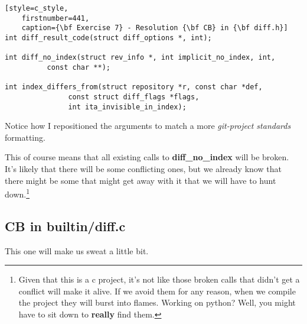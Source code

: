 \begin{lstlisting}[style=c_style,
	firstnumber=441,
	caption={\bf Exercise 7} - Resolution {\bf CB} in {\bf diff.h}]
int diff_result_code(struct diff_options *, int);

int diff_no_index(struct rev_info *, int implicit_no_index, int,
		  const char **);

int index_differs_from(struct repository *r, const char *def,
		       const struct diff_flags *flags,
		       int ita_invisible_in_index);
\end{lstlisting}

Notice how I repositioned the arguments to match a more {\it git-project standards} formatting.

This of course means that all existing calls to {\bf diff\_no\_index} will be broken. It's likely that there will
be some conflicting ones, but we already know that there might be some that might get away with it that we will
have to hunt down.\footnote{Given that this is a c project, it's not like those broken calls that didn't get a conflict
will make it alive. If we avoid them for any reason, when we compile the project they will burst into flames. Working on
python? Well, you might have to sit down to {\bf really} find them.}

\subsection*{CB in builtin/diff.c}

This one will make us sweat a little bit.

